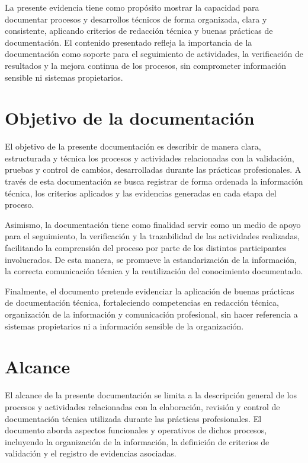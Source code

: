 \documentclass[12pt]{article}
\begin{document}
La presente evidencia tiene como propósito mostrar la capacidad para documentar procesos y desarrollos técnicos de forma organizada, clara y consistente, aplicando criterios de redacción técnica y buenas prácticas de documentación. El contenido presentado refleja la importancia de la documentación como soporte para el seguimiento de actividades, la verificación de resultados y la mejora continua de los procesos, sin comprometer información sensible ni sistemas propietarios.


\section*{Objetivo de la documentación}

El objetivo de la presente documentación es describir de manera clara, estructurada y técnica los procesos y actividades relacionadas con la validación, pruebas y control de cambios, desarrolladas durante las prácticas profesionales. A través de esta documentación se busca registrar de forma ordenada la información técnica, los criterios aplicados y las evidencias generadas en cada etapa del proceso.

Asimismo, la documentación tiene como finalidad servir como un medio de apoyo para el seguimiento, la verificación y la trazabilidad de las actividades realizadas, facilitando la comprensión del proceso por parte de los distintos participantes involucrados. De esta manera, se promueve la estandarización de la información, la correcta comunicación técnica y la reutilización del conocimiento documentado.

Finalmente, el documento pretende evidenciar la aplicación de buenas prácticas de documentación técnica, fortaleciendo competencias en redacción técnica, organización de la información y comunicación profesional, sin hacer referencia a sistemas propietarios ni a información sensible de la organización.


\section*{Alcance}

El alcance de la presente documentación se limita a la descripción general de los procesos y actividades relacionadas con la elaboración, revisión y control de documentación técnica utilizada durante las prácticas profesionales. El documento aborda aspectos funcionales y operativos de dichos procesos, incluyendo la organización de la información, la definición de criterios de validación y el registro de evidencias asociadas.
\end{document}
